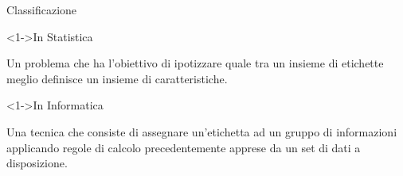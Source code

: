 \begin{tframe}{Classificazione}

    \begin{block}<1->{In Statistica}
        
        
        Un problema che ha l'obiettivo di ipotizzare 
        quale tra un insieme di etichette meglio definisce un insieme di caratteristiche.
        
        
    \end{block}

    \begin{block}<1->{In Informatica}
        
        Una tecnica che consiste di assegnare un'etichetta ad un gruppo di informazioni applicando
        regole di calcolo precedentemente apprese da un set di dati a disposizione.
        
    \end{block}

\end{tframe}